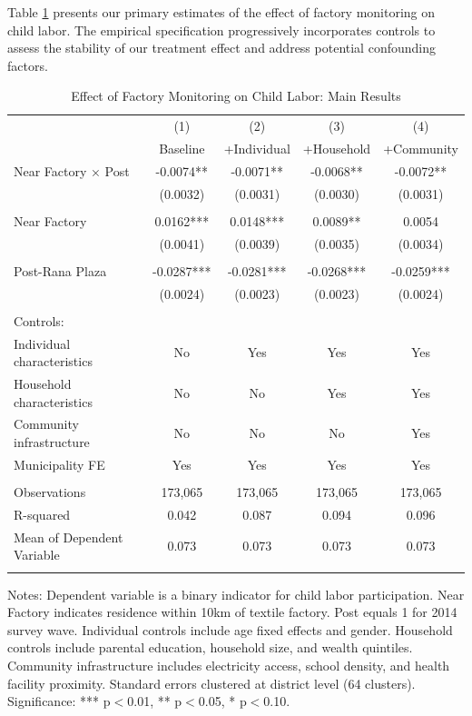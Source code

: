 \documentclass[12pt]{article}
\begin{document}
Table \ref{tab:main_results} presents our primary estimates of the effect of factory monitoring on child labor. The empirical specification progressively incorporates controls to assess the stability of our treatment effect and address potential confounding factors.

\begin{table}[H]
\centering
\caption{Effect of Factory Monitoring on Child Labor: Main Results}
\label{tab:main_results}
\begin{threeparttable}
\begin{tabular}{lcccc}
\toprule
& (1) & (2) & (3) & (4) \\
& Baseline & +Individual & +Household & +Community \\
\midrule
Near Factory × Post & -0.0074** & -0.0071** & -0.0068** & -0.0072** \\
& (0.0032) & (0.0031) & (0.0030) & (0.0031) \\
& & & & \\
Near Factory & 0.0162*** & 0.0148*** & 0.0089** & 0.0054 \\
& (0.0041) & (0.0039) & (0.0035) & (0.0034) \\
& & & & \\
Post-Rana Plaza & -0.0287*** & -0.0281*** & -0.0268*** & -0.0259*** \\
& (0.0024) & (0.0023) & (0.0023) & (0.0024) \\
\\
\midrule
Controls: & & & & \\
\quad Individual characteristics & No & Yes & Yes & Yes \\
\quad Household characteristics & No & No & Yes & Yes \\
\quad Community infrastructure & No & No & No & Yes \\
\quad Municipality FE & Yes & Yes & Yes & Yes \\
\\
\midrule
Observations & 173,065 & 173,065 & 173,065 & 173,065 \\
R-squared & 0.042 & 0.087 & 0.094 & 0.096 \\
Mean of Dependent Variable & 0.073 & 0.073 & 0.073 & 0.073 \\
\\
\bottomrule
\end{tabular}
\begin{tablenotes}
\footnotesize
\item Notes: Dependent variable is a binary indicator for child labor participation. Near Factory indicates residence within 10km of textile factory. Post equals 1 for 2014 survey wave. Individual controls include age fixed effects and gender. Household controls include parental education, household size, and wealth quintiles. Community infrastructure includes electricity access, school density, and health facility proximity. Standard errors clustered at district level (64 clusters). Significance: *** p$<$0.01, ** p$<$0.05, * p$<$0.10.
\end{tablenotes}
\end{threeparttable}
\end{table}
\end{document}
